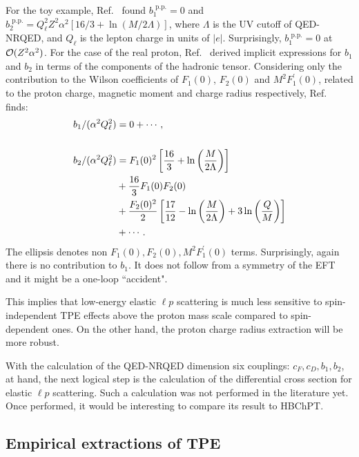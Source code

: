 For the toy example, Ref.~\cite{Dye:2018rgg} found $b_1^{\text{ p.p.}}=0$ and $b_2^\text{ p.p.}=Q_\ell^2Z^2\alpha^2\left[{16}/{3}+\ln\left({M}/{2\Lambda}\right)\right]$, where $\Lambda$ is the UV cutoff of QED-NRQED, and $Q_\ell$ is the lepton charge in units of $|e|$. Surprisingly, $b_1^{\text{ p.p.}}=0$ at ${\cal O}(Z^2\alpha^2)$. For the case of the real proton, Ref.~\cite{Dye:2018rgg} derived implicit expressions for $b_1$ and $b_2$ in terms of the components of the hadronic tensor. Considering only the contribution to the Wilson coefficients of $F_1(0)$, $F_2(0)$ and $M^2 F_1^\prime(0)$, related to the proton charge, magnetic moment and charge radius respectively, Ref.~\cite{Dye:2018rgg} finds: 
\begin{align}
b_1/(\alpha^2Q_\ell^2)&=0+\cdots\,,\\
\nonumber\\
b_2/(\alpha^2Q_\ell^2)&=F_1(0)^2\left[\frac{16}{3}+\ln\left(\frac{M}{2\Lambda}\right)\right] \nonumber\\&+\frac{16}{3}F_1(0)F_2(0)\nonumber\\&+\frac{F_2(0)^2}{2}\left[\frac{17}{12}-\ln\left(\frac{M}{2\Lambda}\right)+3\ln\left(\frac{Q}{M}\right)\right]\nonumber\\&+\cdots\,. 
\end{align}
The ellipsis denotes  $\mbox{non } F_1(0), F_2(0), M^2 F_1^\prime(0)$ terms.  Surprisingly, again there is no contribution to $b_1$. It does not follow from a symmetry of the EFT and it might be a one-loop ``accident". %


This implies that low-energy elastic $\ell p$ scattering is much less sensitive to spin-independent TPE effects above the proton mass scale compared to spin-dependent ones. On the other hand, the proton charge radius extraction will be more robust. 

With the calculation of the QED-NRQED dimension six couplings: $c_F,c_D, b_1, b_2$, at hand, the next logical step is the calculation of the differential cross section for elastic $\ell p$ scattering. Such a calculation was not performed in the literature yet. Once performed, it would be interesting to compare its result to HBChPT. 



\subsection{Empirical extractions of TPE}

